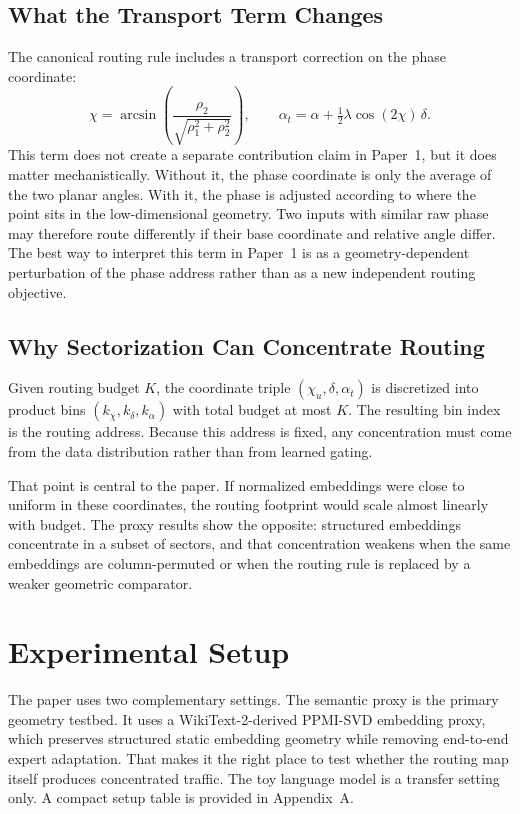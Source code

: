 \documentclass[10pt,twocolumn]{article}
\begin{document}
\subsection{What the Transport Term Changes}
The canonical routing rule includes a transport correction on the phase coordinate:
\begin{equation}
\chi = \arcsin\left(\frac{\rho_2}{\sqrt{\rho_1^2+\rho_2^2}}\right), \qquad
\alpha_t = \alpha + \tfrac{1}{2}\lambda \cos(2\chi)\,\delta.
\label{eq:transport}
\end{equation}
This term does not create a separate contribution claim in Paper~1, but it does matter mechanistically. Without it, the phase coordinate is only the average of the two planar angles. With it, the phase is adjusted according to where the point sits in the low-dimensional geometry. Two inputs with similar raw phase may therefore route differently if their base coordinate and relative angle differ. The best way to interpret this term in Paper~1 is as a geometry-dependent perturbation of the phase address rather than as a new independent routing objective.

\subsection{Why Sectorization Can Concentrate Routing}
Given routing budget $K$, the coordinate triple $(\chi_u,\delta,\alpha_t)$ is discretized into product bins $(k_\chi,k_\delta,k_\alpha)$ with total budget at most $K$. The resulting bin index is the routing address. Because this address is fixed, any concentration must come from the data distribution rather than from learned gating.

That point is central to the paper. If normalized embeddings were close to uniform in these coordinates, the routing footprint would scale almost linearly with budget. The proxy results show the opposite: structured embeddings concentrate in a subset of sectors, and that concentration weakens when the same embeddings are column-permuted or when the routing rule is replaced by a weaker geometric comparator.

\section{Experimental Setup}
The paper uses two complementary settings. The semantic proxy is the primary geometry testbed. It uses a WikiText-2-derived PPMI-SVD embedding proxy, which preserves structured static embedding geometry while removing end-to-end expert adaptation. That makes it the right place to test whether the routing map itself produces concentrated traffic. The toy language model is a transfer setting only. A compact setup table is provided in Appendix~A.
\end{document}
